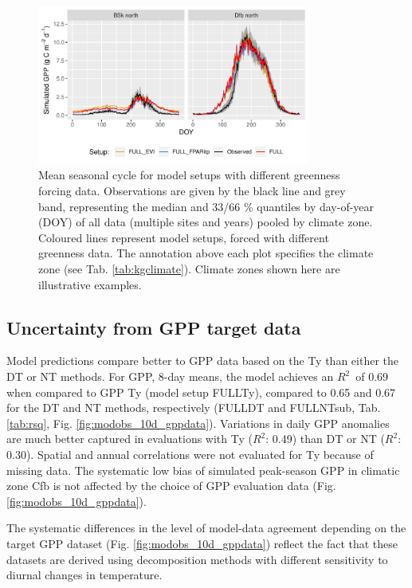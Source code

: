 \documentclass{myreport}
\newcommand{\rsq}{$R^2$}
\begin{document}
 \begin{figure}[!ht]
    \centering
\includegraphics[width=0.8\textwidth]{fig/meandoy_byzone_greenness.pdf}
    \caption{Mean seasonal cycle for model setups with different greenness forcing data. Observations are given by the black line and grey band, representing the median and 33/66 \% quantiles by day-of-year (DOY) of all data (multiple sites and years) pooled by climate zone. Coloured lines represent model setups, forced with different greenness data. The annotation above each plot specifies the climate zone (see Tab. \ref{tab:kgclimate}). Climate zones shown here are illustrative examples.}
    \label{fig:season_greenness}
\end{figure}


\subsection{Uncertainty from GPP target data}
\label{sec:results_gppdata}

Model predictions compare better to GPP data based on the Ty than either the DT or NT methods. For GPP,  8-day means, the model achieves an \rsq\ of 0.69 when compared to GPP Ty (model setup FULL\textunderscore Ty), compared to 0.65 and 0.67 for the DT and NT methods, respectively (FULL\textunderscore DT and FULL\textunderscore NTsub, Tab. \ref{tab:rsq}, Fig. \ref{fig:modobs_10d_gppdata}). Variations in daily GPP anomalies are much better captured in evaluations with Ty (\rsq : 0.49) than DT or NT (\rsq : 0.30). Spatial and annual correlations were not evaluated for Ty because of missing data. The systematic low bias of simulated peak-season GPP in climatic zone Cfb is not affected by the choice of GPP evaluation data (Fig. \ref{fig:modobs_10d_gppdata}).

The systematic differences in the level of model-data agreement depending on the target GPP dataset (Fig. \ref{fig:modobs_10d_gppdata}) reflect the fact that these datasets are derived using decomposition methods with different sensitivity to diurnal changes in temperature.
\end{document}
